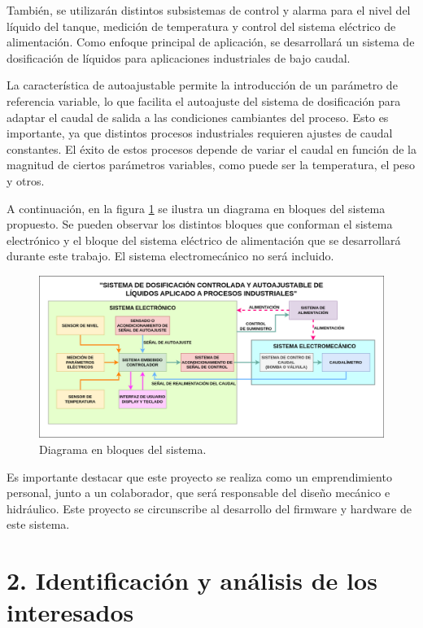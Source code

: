 \documentclass[
11pt, %
]{charter}
\begin{document}
También, se utilizarán distintos subsistemas de control y alarma para el nivel del líquido del tanque, medición de temperatura y control del sistema eléctrico de alimentación. Como enfoque principal de aplicación, se desarrollará un sistema de dosificación de líquidos para aplicaciones industriales de bajo caudal.

La característica de autoajustable permite la introducción de un parámetro de referencia variable, lo que facilita el autoajuste del sistema de dosificación para adaptar el caudal de salida a las condiciones cambiantes del proceso. Esto es importante, ya que distintos procesos industriales requieren ajustes de caudal constantes. El éxito de estos procesos depende de variar el caudal en función de la magnitud de ciertos parámetros variables, como puede ser la temperatura, el peso y otros.

A continuación, en la figura \ref{fig:diagBloquesGeneral} se ilustra un diagrama en bloques del sistema propuesto. Se pueden observar los distintos bloques que conforman el sistema electrónico y el bloque del sistema eléctrico de alimentación que se desarrollará durante este trabajo. El sistema electromecánico no será incluido.

\begin{figure}[htpb]
\centering 
\includegraphics[width=.95\textwidth]{./Figuras/diagBloquesGeneral.png}
\caption{Diagrama en bloques del sistema.}
\label{fig:diagBloquesGeneral}
\end{figure}

Es importante destacar que este proyecto se realiza como un emprendimiento personal, junto a un colaborador, que será responsable del diseño mecánico e hidráulico. Este proyecto se circunscribe al desarrollo del firmware y hardware de este sistema.

\section{2. Identificación y análisis de los interesados}
\label{sec:interesados}
\end{document}
